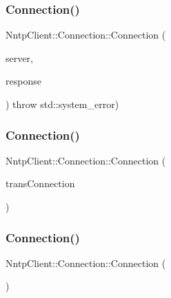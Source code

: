 \subsubsection{\texorpdfstring{Connection()}{Connection()}\hspace{0.1cm}{\footnotesize\ttfamily [2/4]}}
{\footnotesize\ttfamily Nntp\+Client\+::\+Connection\+::\+Connection (\begin{DoxyParamCaption}\item[{const \hyperlink{class_nntp_client_1_1_server_addr}{Server\+Addr} \&}]{server,  }\item[{\hyperlink{class_nntp_client_1_1_response}{Response} \&}]{response }\end{DoxyParamCaption}) throw  std\+::system\+\_\+error) }

\hypertarget{class_nntp_client_1_1_connection_ac9d3d28905af4a394e70745ff2b74e72}{}\label{class_nntp_client_1_1_connection_ac9d3d28905af4a394e70745ff2b74e72} 
\subsubsection{\texorpdfstring{Connection()}{Connection()}\hspace{0.1cm}{\footnotesize\ttfamily [3/4]}}
{\footnotesize\ttfamily Nntp\+Client\+::\+Connection\+::\+Connection (\begin{DoxyParamCaption}\item[{\hyperlink{class_nntp_client_1_1_connection}{Connection} \&\&}]{trans\+Connection }\end{DoxyParamCaption})}

\hypertarget{class_nntp_client_1_1_connection_af42bb1e5ff15c16c8779d10965d0e5d8}{}\label{class_nntp_client_1_1_connection_af42bb1e5ff15c16c8779d10965d0e5d8} 
\subsubsection{\texorpdfstring{Connection()}{Connection()}\hspace{0.1cm}{\footnotesize\ttfamily [4/4]}}
{\footnotesize\ttfamily Nntp\+Client\+::\+Connection\+::\+Connection (\begin{DoxyParamCaption}\item[{const \hyperlink{class_nntp_client_1_1_connection}{Connection} \&}]{ }\end{DoxyParamCaption})\hspace{0.3cm}{\ttfamily [delete]}}

